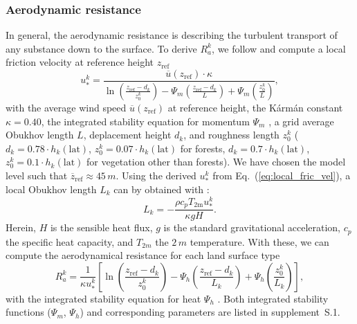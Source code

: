 \documentclass[gmd, manuscript]{copernicus}
\begin{document}
\subsubsection{Aerodynamic resistance}
\label{subsubsec:Ra}
In general, the aerodynamic resistance is describing the turbulent transport of any substance down to the surface. To derive $R_a^k$, we follow \citet{WASP:Simpson2003,ACP:Simpson2012} and compute a local friction velocity at reference height $z_\mathrm{ref}$ \citep[Eq.~(52),][]{ACP:Simpson2012}
\begin{equation}
  u_*^k = \frac{\overline{u}(z_\mathrm{ref})\cdot\kappa}{\ln{(\frac{z_\mathrm{ref}-d_k}{z_0^k})}-\Psi_m(\frac{z_\mathrm{ref}-d_k}{L})+\Psi_m(\frac{z_0^k}{L})},
  \label{eq:local_fric_vel}
\end{equation}
with the average wind speed $\overline{u}(z_\mathrm{ref})$ at reference height, the K\'{a}rm\'{a}n constant $\kappa = 0.40$, the integrated stability equation for momentum $\Psi_m$ \citep[e.g.,][]{Garratt1992}, a grid average Obukhov length $L$, deplacement height $d_k$, and roughness length $z_0^k$ ($d_k=0.78\cdot h_k(\mathrm{lat})$, $z_0^k=0.07\cdot h_k(\mathrm{lat})$ for forests, $d_k=0.7\cdot h_k(\mathrm{lat})$, $z_0^k=0.1\cdot h_k(\mathrm{lat})$ for vegetation other than forests). We have chosen the model level such that $\overline{z}_\mathrm{ref}\approx 45\,\unit{m}$. Using the derived $u_*^k$ from Eq.~(\ref{eq:local_fric_vel}), a local Obukhov length $L_k$ can by obtained with \citep[Eq.~(8),][]{ACP:Simpson2012}:
\begin{equation}
  L_k = - \frac{\rho c_p T_\mathrm{2m} u_*^k}{\kappa g H}.
\end{equation}
Herein, $H$ is the sensible heat flux, $g$ is the standard gravitational acceleration, $c_p$ the specific heat capacity, and $T_{2m}$ the $2\,\unit{m}$ temperature. With these, we can compute the aerodynamical resistance for each land surface type \citep[Eq.~(8.8),][]{WASP:Simpson2003}
\begin{equation}
  R_a^k = \frac{1}{\kappa u_*^k}\left[{\ln{\left(\frac{z_\mathrm{ref}-d_k}{z_0^k}\right)}-\Psi_h\left(\frac{z_\mathrm{ref}-d_k}{L_k}\right)+\Psi_h\left(\frac{z_0^k}{L_k}\right)}\right],
\end{equation}
with the integrated stability equation for heat $\Psi_h$ \citep[e.g.,][]{Garratt1992}. Both integrated stability functions ($\Psi_m$, $\Psi_h$) and corresponding parameters are listed in supplement~S.1.
\end{document}
